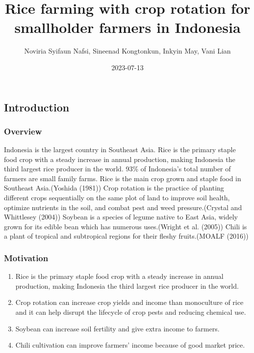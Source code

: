 \documentclass[
]{article}
\title{Rice farming with crop rotation for smallholder farmers in
Indonesia}
\author{Noviria Syifaun Nafsi, Sineenad Kongtonkun, Inkyin May, Vani
Lian}
\date{2023-07-13}
\providecommand{\tightlist}{%
  \setlength{\itemsep}{0pt}\setlength{\parskip}{0pt}}
\begin{document}
\maketitle

\hypertarget{introduction}{%
\subsection{Introduction}\label{introduction}}

\hypertarget{overview}{%
\subsubsection{Overview}\label{overview}}

Indonesia is the largest country in Southeast Asia. Rice is the primary
staple food crop with a steady increase in annual production, making
Indonesia the third largest rice producer in the world. 93\% of
Indonesia's total number of farmers are small family farms. Rice is the
main crop grown and staple food in Southeast Asia.(Yoshida (1981)) Crop
rotation is the practice of planting different crops sequentially on the
same plot of land to improve soil health, optimize nutrients in the
soil, and combat pest and weed pressure.(Crystal and Whittlesey (2004))
Soybean is a species of legume native to East Asia, widely grown for its
edible bean which has numerous uses.(Wright et al. (2005)) Chili is a
plant of tropical and subtropical regions for their fleshy fruits.(MOALF
(2016))

\hypertarget{motivation}{%
\subsubsection{Motivation}\label{motivation}}

\begin{enumerate}
\def\labelenumi{\arabic{enumi}.}
\tightlist
\item
  Rice is the primary staple food crop with a steady increase in annual
  production, making Indonesia the third largest rice producer in the
  world.
\item
  Crop rotation can increase crop yields and income than monoculture of
  rice and it can help disrupt the lifecycle of crop pests and reducing
  chemical use.
\item
  Soybean can increase soil fertility and give extra income to farmers.
\item
  Chili cultivation can improve farmers' income because of good market
  price.
\end{enumerate}
\end{document}
